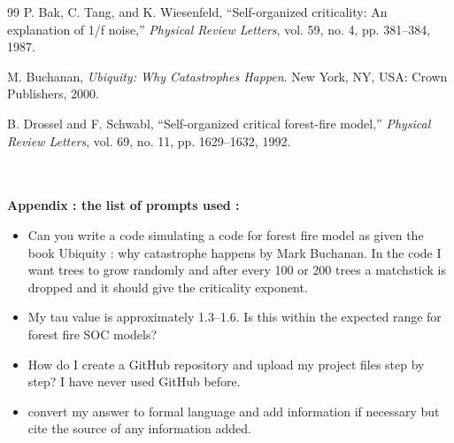 \documentclass{article}
\begin{document}
\begin{thebibliography}{99}
P. Bak, C. Tang, and K. Wiesenfeld, ``Self-organized criticality: An explanation of 1/f noise,'' \textit{Physical Review Letters}, vol. 59, no. 4, pp. 381--384, 1987.

M. Buchanan, \textit{Ubiquity: Why Catastrophes Happen}. New York, NY, USA: Crown Publishers, 2000.

B. Drossel and F. Schwabl, ``Self-organized critical forest-fire model,'' \textit{Physical Review Letters}, vol. 69, no. 11, pp. 1629--1632, 1992.
\end{thebibliography}\\
\\
\textbf{Appendix : the list of prompts used :}
\begin{itemize}
\item Can you write a code simulating a code for forest fire model as given the book Ubiquity : why catastrophe happens by Mark Buchanan. In the code I want trees to grow randomly and after every 100 or 200 trees a matchstick is dropped and it should give the criticality exponent.
\item My tau value is approximately 1.3–1.6. Is this within the expected range for forest fire SOC models?
\item How do I create a GitHub repository and upload my project files step by step? I have never used GitHub before.
\item convert my answer to formal language and add information if necessary but cite the source of any information added.
\end{itemize}
\end{document}
